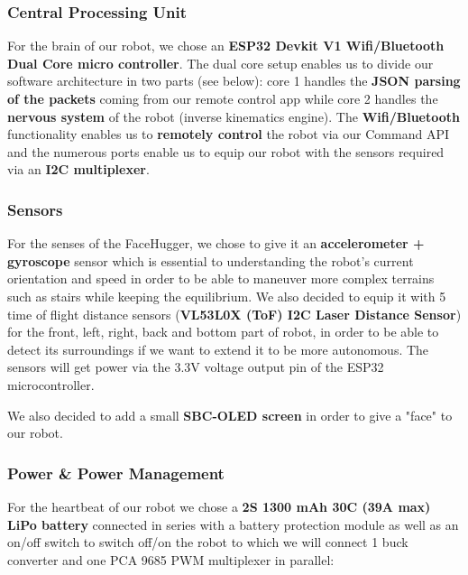 \documentclass{article}
\begin{document}
\subsubsection{Central Processing Unit}

For the brain of our robot, we chose an \textbf{ESP32 Devkit V1 Wifi/Bluetooth Dual Core micro controller}. The dual core setup enables us to divide our software architecture in two parts (see below): core 1 handles the \textbf{JSON parsing of the packets} coming from our remote control app while core 2 handles the \textbf{nervous system} of the robot (inverse kinematics engine). The \textbf{Wifi/Bluetooth} functionality enables us to \textbf{remotely control} the robot via our Command API and the numerous ports enable us to equip our robot with the sensors required via an \textbf{I2C multiplexer}.

\subsubsection{Sensors}

For the senses of the FaceHugger, we chose to give it an \textbf{accelerometer + gyroscope} sensor which is essential to understanding the robot's current orientation and speed in order to be able to maneuver more complex terrains such as stairs while keeping the equilibrium. We also decided to equip it with 5 time of flight distance sensors (\textbf{VL53L0X (ToF) I2C Laser Distance Sensor}) for the front, left, right, back and bottom part of robot, in order to be able to detect its surroundings if we want to extend it to be more autonomous. The sensors will get power via the 3.3V voltage output pin of the ESP32 microcontroller.

\vspace{0.5cm}
We also decided to add a small \textbf{SBC-OLED screen} in order to give a "face" to our robot.

\subsubsection{Power \& Power Management}

For the heartbeat of our robot we chose a \textbf{2S 1300 mAh 30C (39A max) LiPo battery} connected in series with a battery protection module as well as an on/off switch to switch off/on the robot to which we will connect 1 buck converter and one PCA 9685 PWM multiplexer in parallel:
\end{document}
